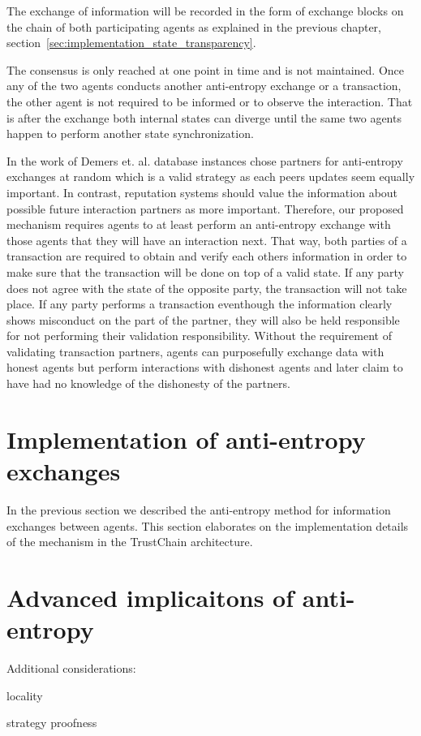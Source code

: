 The exchange of information will be recorded in the form of exchange blocks on the chain of both 
participating agents as explained in the previous chapter, section~\ref{sec:implementation_state_transparency}.

The consensus is only reached at one point in time and is not maintained. Once any of the two agents
conducts another anti-entropy exchange or a transaction, the other agent is not required to be 
informed or to observe the interaction. That is after the exchange both internal states can diverge
until the same two agents happen to perform another state synchronization. 

In the work of Demers et. al. database instances chose partners for anti-entropy exchanges at random
which is a valid strategy as each peers updates seem equally important. In contrast, reputation 
systems should value the information about possible future interaction partners as more important.
Therefore, our proposed mechanism requires agents to at least perform an anti-entropy exchange with
those agents that they will have an interaction next. That way, both parties of a transaction are 
required to obtain and verify each others information in order to make sure that the transaction 
will be done on top of a valid state. If any party does not agree with the state of the opposite 
party, the transaction will not take place. If any party performs a transaction eventhough the 
information clearly shows misconduct on the part of the partner, they will also be held responsible 
for not performing their validation responsibility. Without the requirement of validating transaction
partners, agents can purposefully exchange data with honest agents but perform interactions with 
dishonest agents and later claim to have had no knowledge of the dishonesty of the partners. 

\section{Implementation of anti-entropy exchanges}
In the previous section we described the anti-entropy method for information exchanges between 
agents. This section elaborates on the implementation details of the mechanism in the TrustChain 
architecture. 



\section{Advanced implicaitons of anti-entropy}
Additional considerations: 

locality

strategy proofness 

